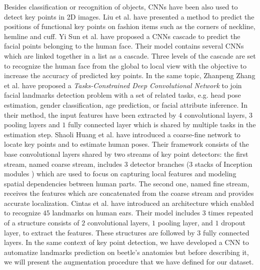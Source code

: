 \documentclass[review]{elsarticle}
\begin{document}
 
Besides classification or recognition of objects, CNNs have been also
used to detect key points in 2D images. Liu et
al. \cite{liu2016fashion} have presented a method to predict the
positions of functional key points on fashion items such as the
corners of neckline, hemline and cuff. Yi Sun et
al. \cite{sun2013deep} have proposed a CNNs cascade to predict the
facial points belonging to the human face. Their model contains several CNNs which are linked together in a list
as a cascade. Three levels of the cascade are set to recognize the
human face from the global to local view with the objective to
increase the accuracy of predicted key points. In the same topic,
Zhanpeng Zhang et al. \cite{zhang2014facial} have proposed a
\textit{Tasks-Constrained Deep Convolutional Network} to join facial
landmarks detection problem with a set of related tasks, e.g. head
pose estimation, gender classification, age prediction, or facial
attribute inference. In their method, the input features have been
extracted by $4$ convolutional layers, $3$ pooling layers and $1$
fully connected layer which is shared by  multiple tasks in the
estimation step. Shaoli Huang et al. \cite{huang2017coarse} have
introduced a coarse-fine network to locate key points and to estimate
human poses. Their framework consists of the base convolutional layers
shared by two streams of key point detectors: the first stream, named
coarse stream, includes $3$ detector branches (3 stacks of Inception
modules \cite{szegedy2015going}) which are used to focus on capturing
local features and modeling spatial dependencies between human
parts. The second one, named fine stream, receives the  features which
are concatenated from the coarse stream and provides accurate
localization. Cintas et al. \cite{cintas2016automatic} have introduced
an architecture which enabled to recognize $45$ landmarks on human
ears. Their model includes $3$ times repeated of a structure consists of $2$ convolutional layers,
$1$ pooling layer, and $1$ dropout layer, to extract the
features. These structures are followed by $3$
fully connected layers. In the same context of key point detection, we
have developed a CNN to automatize landmarks prediction on beetle's
anatomies but before describing it, we will present the augmentation
procedure that we have defined for our dataset.



\end{document}
